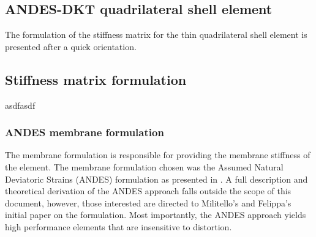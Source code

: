 




\setcounter{MaxMatrixCols}{20}

\begin{flushleft}
	\chapter{ANDES-DKT quadrilateral shell element}
\end{flushleft}
\renewcommand{\Thema}{ANDES-DKT quadrilateral shell element}
The formulation of the stiffness matrix for the thin quadrilateral shell element is presented after a quick orientation.

\section{Stiffness matrix formulation}

asdfasdf

\subsection{ANDES membrane formulation}

The membrane formulation is responsible for providing the membrane stiffness of the element. The membrane formulation chosen was the Assumed Natural Deviatoric Strains (ANDES) formulation as presented in \cite{Hau94}. A full description and theoretical derivation of the ANDES approach falls outside the scope of this document, however, those interested are directed to Militello's and Felippa's initial paper \cite{Fel91} on the formulation. Most importantly, the ANDES approach yields high performance elements that are insensitive to distortion.


